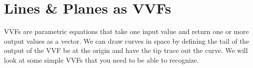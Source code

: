 \section{Lines \& Planes as VVFs}
\noindent
VVFs are parametric equations that take one input value and return one or more output values as a vector. We can draw curves in space by defining the tail of the output of the VVF be at the origin and have the tip trace out the curve. We will look at some simple VVFs that you need to be able to recognize.\\

